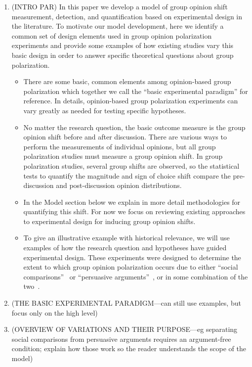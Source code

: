 \documentclass[11pt,letterpaper]{article}
\begin{document}
\begin{enumerate}
  \item
    (INTRO PAR) In this paper we develop a model of group opinion shift measurement,
    detection, and quantification based on experimental design in the literature.
    To motivate our model development, here we identify a common set of
    design elements used in group opinion polarization experiments and 
    provide some examples of how existing studies vary this basic design in
    order to answer specific theoretical questions about group polarization.
    \begin{itemize}
      \item 
        There are some basic, common elements among opinion-based group polarization
        which together we call the ``basic experimental paradigm'' for reference.
        In details, opinion-based group polarization experiments can vary greatly
        as needed for testing specific hypotheses.
      \item 
        No matter the research question, the basic outcome measure is the 
        group opinion shift before and after discussion. There are various ways
        to perform the measurements of individual opinions, but all 
        group polarization studies must measure a group opinion shift. 
        In group polarization studies, several group shifts are observed, so 
        the statistical tests to quantify the magnitude and sign of choice shift
        compare the pre-discussion and post-discussion opinion distributions.
      \item
        In the Model section below we explain in more detail methodologies
        for quantifying this shift. For now we focus on reviewing existing
        approaches to experimental design for inducing group opinion shifts.
      \item
        To give an illustrative example with historical relevance, we will use
        examples of how the research question and hypotheses have guided
        experimental design. These experiments were designed
        to determine the extent to which
        group opinion polarization occurs due to either 
        ``social comparisons''~\cite{Myers1978} or ``persuasive 
        arguments''~\cite{Vinokur1978}, 
        or in some combination of the 
        two~\cite{Burnstein1973,Burnstein1977,Sieber2019}.
    \end{itemize}
  \item 
    (THE BASIC EXPERIMENTAL PARADIGM---can still use examples, but focus
    only on the high level)
  \item 
    (OVERVIEW OF VARIATIONS AND THEIR PURPOSE---eg separating social comparisons
    from persuasive arguments requires an argument-free condition; explain 
    how those work so the reader understands the scope of the model)
\end{enumerate}
\end{document}
